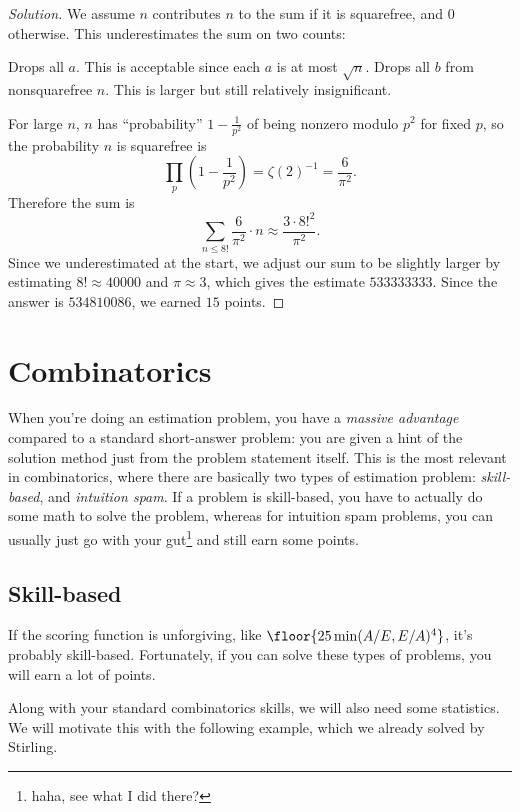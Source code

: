 \documentclass[11pt]{scrartcl}
\renewenvironment{solution}{\renewcommand\qedsymbol{$\blacksquare$}\begin{proof}[Solution]}{\end{proof}}
\begin{document}
\begin{solution}
	We assume $n$ contributes $n$ to the sum if it is squarefree, and $0$ otherwise. This underestimates the sum on two counts:
	\begin{itemize}
		\ii Drops all $a$. This is acceptable since each $a$ is at most $\sqrt n$.
		\ii Drops all $b$ from nonsquarefree $n$. This is larger but still relatively insignificant.
	\end{itemize}
	For large $n$, $n$ has ``probability'' $1 - \frac1{p^2}$ of being nonzero modulo $p^2$ for fixed $p$, so the probability $n$ is squarefree is
	\[\prod_p\left( 1 - \frac1{p^2} \right) = \zeta(2)^{-1} = \frac6{\pi^2}.\]
	Therefore the sum is
	\[\sum_{n \le 8!}\frac6{\pi^2} \cdot n \approx \frac{3 \cdot 8!^2}{\pi^2}.\]
	Since we underestimated at the start, we adjust our sum to be slightly larger by estimating $8! \approx 40000$ and $\pi \approx 3$, which gives the estimate $533333333$. Since the answer is $534810086$, we earned $15$ points.
\end{solution}

\section{Combinatorics}

When you're doing an estimation problem, you have a \emph{massive advantage} compared to a standard short-answer problem: you are given a hint of the solution method just from the problem statement itself. This is the most relevant in combinatorics, where there are basically two types of estimation problem: \emph{skill-based}, and \emph{intuition spam}. If a problem is skill-based, you have to actually do some math to solve the problem, whereas for intuition spam problems, you can usually just go with your gut\footnote{haha, see what I did there?} and still earn some points.

\subsection{Skill-based}

If the scoring function is unforgiving, like $\floor{25\min(A/E,E/A)^4}$, it's probably skill-based. Fortunately, if you can solve these types of problems, you will earn a lot of points.

Along with your standard combinatorics skills, we will also need some statistics. We will motivate this with the following example, which we already solved by Stirling.
\end{document}
